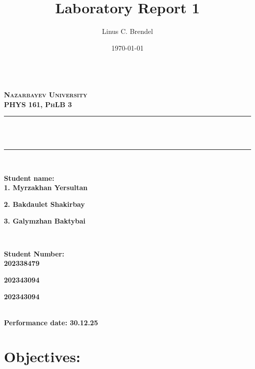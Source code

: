 \documentclass[11pt]{article}
\title{Laboratory Report 1}
\author{Linus C. Brendel}
\date{\today}
\makeatletter
\let\thetitle\@title
\makeatother
\begin{document}
\begin{titlepage}
	\centering
    \vspace*{0.5 cm}
    \\[1.0 cm]	
    \textsc{\LARGE \textbf{Nazarbayev University}}\\[2.0 cm]
	\textsc{\Large \textbf{PHYS 161, PhLB 3}}\\[0.5 cm]							 
	\rule{\linewidth}{0.2 mm} \\[0.4 cm]
	{ \huge \bfseries \thetitle}\\
	\rule{\linewidth}{0.2 mm} \\[1.5 cm]
	
	\begin{minipage}{0.4\textwidth}
		\begin{flushleft} \large
			\textbf{{Student name:}}\\
			\textbf{1. Myrzakhan Yersultan}
            
                \textbf{2. Bakdaulet Shakirbay}
                
                \textbf{3. Galymzhan Baktybai}
			\end{flushleft}
			\end{minipage}~
			\begin{minipage}{0.4\textwidth}
			\begin{flushright} \large
            \vspace{-0.3cm}
			\textbf{Student Number:} \\
			\textbf{202338479}
            
            \textbf{202343094}
            
            \textbf{202343094}
		\end{flushright}
	\end{minipage}\\[2 cm]
	
	{\large{\textbf{Performance date: 30.12.25}}}\\[2 cm]
 
	\vfill
	
\end{titlepage}

\section*{Objectives:}
\end{document}
